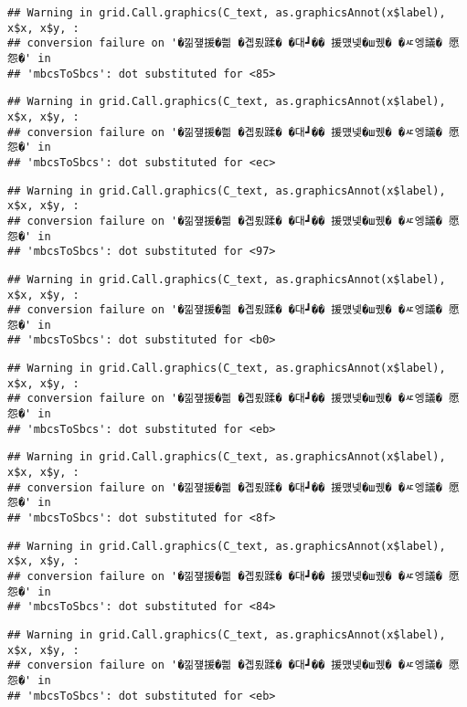 \documentclass[
]{article}
\begin{document}
\begin{verbatim}
## Warning in grid.Call.graphics(C_text, as.graphicsAnnot(x$label), x$x, x$y, :
## conversion failure on '�낆쟾援�쁾 �곕룄蹂� �대┛�� 援먰넻�ш퀬� �ㅼ엥議� 愿怨�' in
## 'mbcsToSbcs': dot substituted for <85>
\end{verbatim}

\begin{verbatim}
## Warning in grid.Call.graphics(C_text, as.graphicsAnnot(x$label), x$x, x$y, :
## conversion failure on '�낆쟾援�쁾 �곕룄蹂� �대┛�� 援먰넻�ш퀬� �ㅼ엥議� 愿怨�' in
## 'mbcsToSbcs': dot substituted for <ec>
\end{verbatim}

\begin{verbatim}
## Warning in grid.Call.graphics(C_text, as.graphicsAnnot(x$label), x$x, x$y, :
## conversion failure on '�낆쟾援�쁾 �곕룄蹂� �대┛�� 援먰넻�ш퀬� �ㅼ엥議� 愿怨�' in
## 'mbcsToSbcs': dot substituted for <97>
\end{verbatim}

\begin{verbatim}
## Warning in grid.Call.graphics(C_text, as.graphicsAnnot(x$label), x$x, x$y, :
## conversion failure on '�낆쟾援�쁾 �곕룄蹂� �대┛�� 援먰넻�ш퀬� �ㅼ엥議� 愿怨�' in
## 'mbcsToSbcs': dot substituted for <b0>
\end{verbatim}

\begin{verbatim}
## Warning in grid.Call.graphics(C_text, as.graphicsAnnot(x$label), x$x, x$y, :
## conversion failure on '�낆쟾援�쁾 �곕룄蹂� �대┛�� 援먰넻�ш퀬� �ㅼ엥議� 愿怨�' in
## 'mbcsToSbcs': dot substituted for <eb>
\end{verbatim}

\begin{verbatim}
## Warning in grid.Call.graphics(C_text, as.graphicsAnnot(x$label), x$x, x$y, :
## conversion failure on '�낆쟾援�쁾 �곕룄蹂� �대┛�� 援먰넻�ш퀬� �ㅼ엥議� 愿怨�' in
## 'mbcsToSbcs': dot substituted for <8f>
\end{verbatim}

\begin{verbatim}
## Warning in grid.Call.graphics(C_text, as.graphicsAnnot(x$label), x$x, x$y, :
## conversion failure on '�낆쟾援�쁾 �곕룄蹂� �대┛�� 援먰넻�ш퀬� �ㅼ엥議� 愿怨�' in
## 'mbcsToSbcs': dot substituted for <84>
\end{verbatim}

\begin{verbatim}
## Warning in grid.Call.graphics(C_text, as.graphicsAnnot(x$label), x$x, x$y, :
## conversion failure on '�낆쟾援�쁾 �곕룄蹂� �대┛�� 援먰넻�ш퀬� �ㅼ엥議� 愿怨�' in
## 'mbcsToSbcs': dot substituted for <eb>
\end{verbatim}
\end{document}
